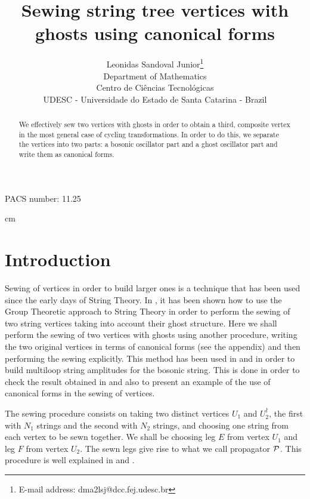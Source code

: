 \documentclass[a4paper,11pt]{article}
\begin{document}
\title{Sewing string tree vertices with ghosts using canonical forms}

\author{Leonidas Sandoval Junior\thanks{E-mail address: dma2lsj@dcc.fej.udesc.br}\\ Department of Mathematics\\ Centro de Ci\^encias Tecnol\'ogicas\\ UDESC - Universidade do Estado de Santa Catarina - Brazil}

\maketitle 

\begin{abstract}
We effectively sew two vertices with ghosts in order to obtain a third, composite vertex in the most general case of cycling transformations. In order to do this, we separate the vertices into two parts: a bosonic oscillator part and a ghost oscillator part and write them as canonical forms.
\end{abstract}

\begin{flushright}\noindent PACS number: 11.25\end{flushright}

 cm 

\section{Introduction}

Sewing of vertices in order to build larger ones is a technique that has been used since the early days of String Theory. In \cite{ls1}, it has been shown how to use the Group Theoretic approach to String Theory \cite{pw1} in order to perform the sewing of two string vertices taking into account their ghost structure. Here we shall perform the sewing of two vertices with ghosts using another procedure, writing the two original vertices in terms of canonical forms (see the appendix) and then performing the sewing explicitly. This method has been used in \cite{cg1} and \cite{cg2} in order to build multiloop string amplitudes for the bosonic string. This is done in order to check the result obtained in \cite{ls1} and also to present an example of the use of canonical forms in the sewing of vertices.

The sewing procedure consists on taking two distinct vertices $U_1$ and $U_2^\dagger $, the first with $N_1$ strings and the second with $N_2$ strings, and choosing one string from each vertex to be sewn together. We shall be choosing leg $E$ from vertex $U_1$ and leg $F$ from vertex $U_2$. The sewn legs give rise to what we call propagator ${\cal P}$. This procedure is well explained in \cite{pw2} and \cite{ls1}.
\end{document}
